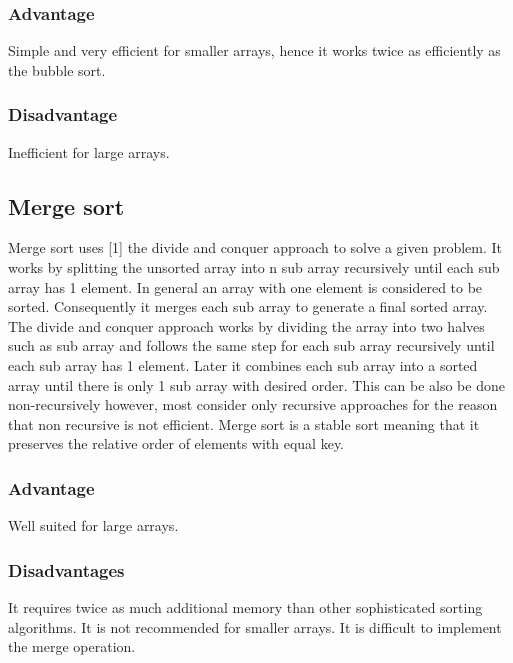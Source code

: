 \documentclass{article}
\begin{document}
\subsubsection{Advantage}
Simple and very efficient for smaller arrays, hence it works twice as efficiently as the bubble sort.

\subsubsection{Disadvantage}	
Inefficient for large arrays.

\subsection{Merge sort}
Merge sort uses [1] the divide and conquer approach to solve a given problem. It works by splitting the unsorted array into n sub array recursively until each sub array has 1 element. In general an array with one element is considered to be sorted. Consequently it merges each sub array to generate afinal sorted array. The divide and conquer approach works by dividing the array into two halves such as sub array and follows the same step for each sub array recursively until each sub array has 1 element. Later it combines each sub array into a sorted array until there is only 1 sub array with desired order. This can be also be done non-recursively however, most consider only recursive approaches for the reason that non recursive is not efficient. Merge sort is a stable sort meaning that it preserves the relative order of elements with equal key.

\subsubsection{Advantage}
Well suited for large arrays.

\subsubsection{Disadvantages}
It requires twice as much additional memory than other sophisticated sorting algorithms.
It is not recommended for smaller arrays. 
It is difficult to implement the merge operation.
\end{document}
